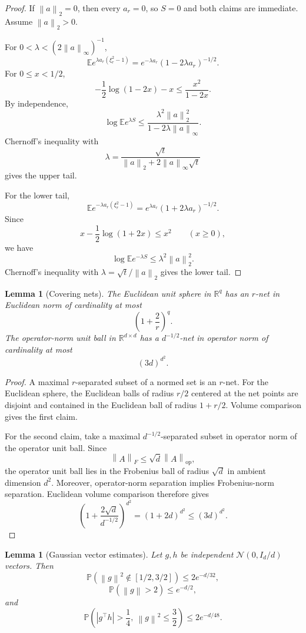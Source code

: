 \documentclass[11pt]{article}
\newtheorem{lemma}[theorem]{Lemma}
\newcommand{\R}{\mathbb{R}}
\newcommand{\E}{\mathbb{E}}
\newcommand{\Pp}{\mathbb{P}}
\newcommand{\1}{\mathbf{1}}
\newcommand{\op}{\mathrm{op}}
\newcommand{\norm}[1]{\left\|#1\right\|}
\newcommand{\abs}[1]{\left|#1\right|}
\begin{document}
\begin{proof}
If \(\norm{a}_2=0\), then every \(a_r=0\), so \(S=0\) and both claims are
immediate.  Assume \(\norm{a}_2>0\).

For \(0<\lambda<(2\norm{a}_\infty)^{-1}\),
\[
 \E e^{\lambda a_r(\xi_r^2-1)}
 =e^{-\lambda a_r}(1-2\lambda a_r)^{-1/2}.
\]
For \(0\le x<1/2\),
\[
 -\frac12\log(1-2x)-x\le\frac{x^2}{1-2x}.
\]
By independence,
\[
 \log\E e^{\lambda S}
 \le
 \frac{\lambda^2\norm{a}_2^2}
 {1-2\lambda\norm{a}_\infty}.
\]
Chernoff's inequality with
\[
 \lambda
 =
 \frac{\sqrt t}{\norm{a}_2+2\norm{a}_\infty\sqrt t}
\]
gives the upper tail.

For the lower tail,
\[
 \E e^{-\lambda a_r(\xi_r^2-1)}
 =e^{\lambda a_r}(1+2\lambda a_r)^{-1/2}.
\]
Since
\[
 x-\frac12\log(1+2x)\le x^2
 \qquad (x\ge0),
\]
we have
\[
 \log\E e^{-\lambda S}\le\lambda^2\norm{a}_2^2.
\]
Chernoff's inequality with \(\lambda=\sqrt t/\norm{a}_2\) gives the lower
tail.
\end{proof}

\begin{lemma}[Covering nets]
\label{lem:nets}
The Euclidean unit sphere in \(\R^q\) has an \(r\)-net in Euclidean norm of
cardinality at most
\[
 \left(1+\frac2r\right)^q.
\]
The operator-norm unit ball in \(\R^{d\times d}\) has a
\(d^{-1/2}\)-net in operator norm of cardinality at most
\[
 (3d)^{d^2}.
\]
\end{lemma}

\begin{proof}
A maximal \(r\)-separated subset of a normed set is an \(r\)-net.  For the
Euclidean sphere, the Euclidean balls of radius \(r/2\) centered at the net
points are disjoint and contained in the Euclidean ball of radius \(1+r/2\).
Volume comparison gives the first claim.

For the second claim, take a maximal \(d^{-1/2}\)-separated subset in operator
norm of the operator unit ball.  Since
\[
 \norm{A}_F\le\sqrt d\norm{A}_{\op},
\]
the operator unit ball lies in the Frobenius ball of radius \(\sqrt d\) in
ambient dimension \(d^2\).  Moreover, operator-norm separation implies
Frobenius-norm separation.  Euclidean volume comparison therefore gives
\[
 \left(1+\frac{2\sqrt d}{d^{-1/2}}\right)^{d^2}
 =(1+2d)^{d^2}
 \le(3d)^{d^2}.
\]
\end{proof}

\begin{lemma}[Gaussian vector estimates]
\label{lem:gaussian-vector}
Let \(g,h\) be independent \(\mathcal N(0,I_d/d)\) vectors.  Then
\[
 \Pp\left(\norm{g}^2\notin[1/2,3/2]\right)
 \le2e^{-d/32},
\]
\[
 \Pp(\norm{g}>2)\le e^{-d/2},
\]
and
\[
 \Pp\left(
 \abs{g^\top h}>\frac14,
 \ \norm{g}^2\le\frac32
 \right)
 \le2e^{-d/48}.
\]
\end{lemma}
\end{document}
